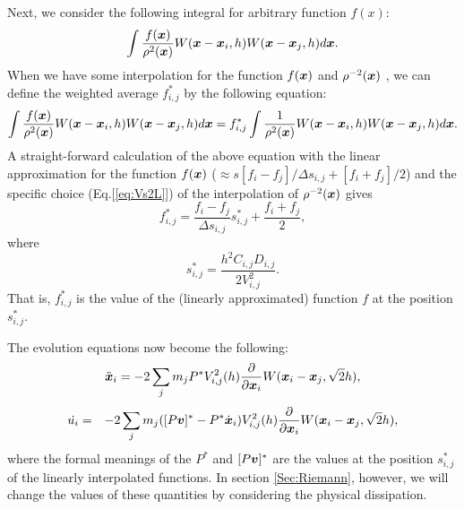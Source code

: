 \documentclass{cjour}
\newcommand{ \Vec   }[1]{ \mbox{\boldmath $ #1 $} }
\newcommand{ \PD    }[2]{ \frac{ \partial #1 }{ \partial #2 } }
\begin{document}
\begin{article}
Next, we consider the following integral for arbitrary function 
$f(x)$: 
\begin{equation}
       \int \frac{f(\Vec{x})}{ \rho^2(\Vec{x}) }
             W(\Vec{x}-\Vec{x}_i, h)
             W(\Vec{x}-\Vec{x}_j, h) d\Vec{x} .  \nonumber 
\end{equation}
When we have some interpolation for the function $f(\Vec{x})$ 
and $\rho^{-2}(\Vec{x})$ , 
we can define the weighted average $f^*_{i,j}$ by the 
following equation: 
\begin{equation}
                 \int \frac{f(\Vec{x})}{ \rho^2(\Vec{x}) }
                      W(\Vec{x}-\Vec{x}_i, h)
                      W(\Vec{x}-\Vec{x}_j, h) d\Vec{x} =
                 f^*_{i,j} 
                 \int \frac{1}{ \rho^2(\Vec{x}) }
                      W(\Vec{x}-\Vec{x}_i, h)
                      W(\Vec{x}-\Vec{x}_j, h) d\Vec{x}  . 
\end{equation}
A straight-forward calculation of the above equation with 
the linear approximation for the function 
$f(\Vec{x})$ ($\approx s [f_i - f_j]/\Delta s_{i,j} + [f_i+f_j]/2$) 
and the specific choice (Eq.[\ref{eq:Vs2L}]) of the interpolation of 
$\rho^{-2}(\Vec{x})$ gives 
\begin{equation}
                f^*_{i,j} = \frac{ f_i - f_j }{\Delta s_{i,j} } 
                             s^*_{i,j}
                          + \frac{ f_i + f_j }{2}  , 
                                                     \label{eq:fijL}
\end{equation}
where 
\begin{equation}
          s^*_{i,j} = \frac{ h^2 C_{i,j}D_{i,j}        }
                           { 2 V^2_{i,j} } . 
                                                     \label{eq:sijL}
\end{equation}
That is, $f^*_{i,j}$ is the value of the (linearly approximated) 
function $f$ at the position $s^*_{i,j}$. 

The evolution equations now become the following:
\begin{equation}
                \ddot{\Vec{x}}_i  = 
              - 2 \sum_{j} m_j 
                         P^*V^2_{i,j} (h)
                         \PD{}{\Vec{x}_i} 
                         W(\Vec{x}_i-\Vec{x}_j, \sqrt{2}h) ,
                                                     \label{eq:EoM2.5}
\end{equation}
%
\begin{eqnarray}
        \dot{u_i}
          & = & - 2 \sum_j m_j 
           ( [P\Vec{v}]^* - P^* \dot{\Vec{x}}_i) 
                         V^2_{i,j} (h)
                         \PD{}{\Vec{x}_i} 
                         W(\Vec{x}_i-\Vec{x}_j, \sqrt{2}h) ,  
                                                     \label{eq:EoE2.5}
\end{eqnarray}
where 
the formal meanings of the $P^*$ and $[P\Vec{v}]^*$ are the 
values at the position $s_{i,j}^*$ of 
the linearly interpolated functions.  
In section \ref{Sec:Riemann}, however, 
we will change the values of these quantities by considering 
the physical dissipation. 


\end{article}
\end{document}
